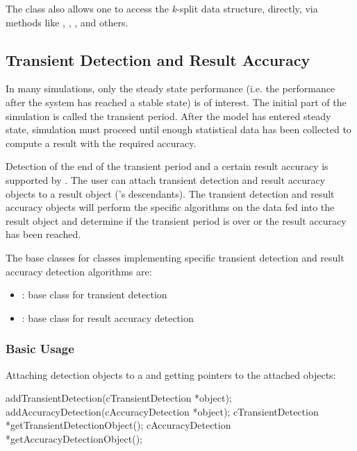 The class also allows one to access the \textit{k}-split data structure,
directly, via methods like , ,
, and others.


\subsection{Transient Detection and Result Accuracy}
\label{sec:sim-lib:transient-detection-and-result-accuracy}

In many simulations, only the steady state performance (i.e.
the performance after the system has reached a stable state)
is of interest. The initial part of the simulation is called
the transient period. After the model has entered steady state,
simulation must proceed until enough statistical data has been
collected to compute a result with the required accuracy.


Detection of the end of the transient period and a certain result
accuracy is supported by {\opp}. The user can attach transient
detection and result accuracy objects to a result object ('s
descendants). The transient detection and result accuracy objects will
perform the specific algorithms on the data fed into the result object and
determine if the transient period is over or the result accuracy has been
reached.

The base classes for classes implementing specific transient
detection and result accuracy detection algorithms are:
\begin{itemize}
\item{: base class for transient detection}
\item{: base class for result accuracy detection}
\end{itemize}


\subsubsection{Basic Usage}
\label{sec:sim-lib:transient-detection-basic-usage}

%
%

Attaching detection objects to a  and getting pointers
to the attached objects:

\begin{cpp}
addTransientDetection(cTransientDetection *object);
addAccuracyDetection(cAccuracyDetection *object);
cTransientDetection *getTransientDetectionObject();
cAccuracyDetection *getAccuracyDetectionObject();
\end{cpp}


